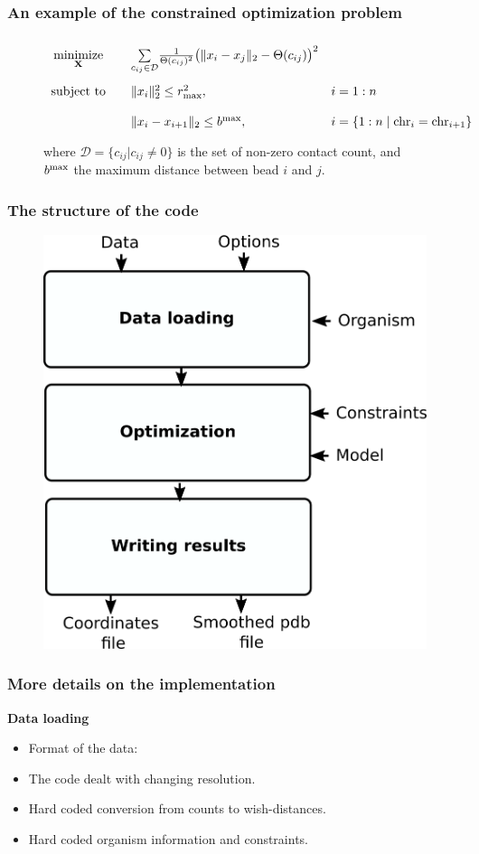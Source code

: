 \documentclass[xcolor=dvipsnames]{beamer}
\begin{document}
\begin{frame}
\frametitle{An example of the constrained optimization problem}
\begin{figure}
\begin{equation*}
\renewcommand{\arraystretch}{2}
\begin{array}{ccll}
\underset{\mathbf{X}}{\text{minimize}} & &
\underset{c_{ij} \in \mathcal{D}}{\sum}
\frac{1}{\Theta(c_{ij})^2}\big(\|x_i - x_j\|_2 - \Theta(c_{ij})\big)^2 &\\
\text{subject to}
& & \|x_i\|_2^2 \leq r_{\rm max}^2, \quad
& i = 1:n\\
& & \|x_i - x_{i+1}\|_2 \leq b^{\rm max} , \quad
& i = \{1:n \;|\; {\rm chr}_i = {\rm chr}_{i+1}\}\\
\end{array}
\end{equation*}
where  $\mathcal{D} = \{ c_{ij} | c_{ij} \neq 0\}$ is
the set of non-zero contact count, and $b^{\rm max}$ the maximum distance
between bead $i$ and $j$.
\end{figure}
\end{frame}

\begin{frame}
\frametitle{The structure of the code}
\begin{figure}
\includegraphics[width=0.6\linewidth]{schema/pastis_old.png}
\end{figure}
\end{frame}

\begin{frame}
\frametitle{More details on the implementation}

{\bf \color{Blue} Data loading}
\begin{itemize}[label={$\bullet$}]
\item Format of the data:
\begin{scriptsize}

\end{scriptsize}
\item The code dealt with changing resolution.
\item Hard coded conversion from counts to wish-distances.
\item Hard coded organism information and constraints.
\end{itemize}
\end{frame}
\end{document}
